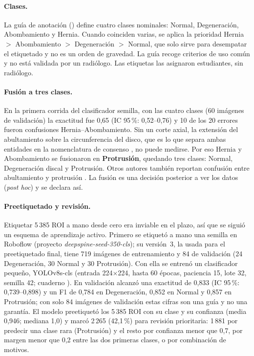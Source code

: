 \paragraph{Clases.} La guía de anotación () define cuatro clases nominales: Normal, Degeneración, Abombamiento y Hernia. Cuando coinciden varias, se aplica la prioridad Hernia $>$ Abombamiento $>$ Degeneración $>$ Normal, que solo sirve para desempatar el etiquetado y no es un orden de gravedad. La guía recoge criterios de uso común y no está validada por un radiólogo. Las etiquetas las asignaron estudiantes, sin radiólogo.

\paragraph{Fusión a tres clases.} En la primera corrida del clasificador semilla, con las cuatro clases (60 imágenes de validación) la exactitud fue 0,65 (IC 95\,\%: 0,52--0,76) y 10 de los 20 errores fueron confusiones Hernia--Abombamiento. Sin un corte axial, la extensión del abultamiento sobre la circunferencia del disco, que es lo que separa ambas entidades en la nomenclatura de consenso \cite{fardon2014}, no puede medirse. Por eso Hernia y Abombamiento se fusionaron en \textbf{Protrusión}, quedando tres clases: Normal, Degeneración discal y Protrusión. Otros autores también reportan confusión entre abultamiento y protrusión \cite{gao2025}. La fusión es una decisión posterior a ver los datos (\emph{post hoc}) y se declara así.

\paragraph{Preetiquetado y revisión.} Etiquetar 5\,385 ROI a mano desde cero era inviable en el plazo, así que se siguió un esquema de aprendizaje activo. Primero se etiquetó a mano una semilla en Roboflow (proyecto \emph{deepspine-seed-350-cls}); su versión~3, la usada para el preetiquetado final, tiene 719 imágenes de entrenamiento y 84 de validación (24 Degeneración, 30 Normal y 30 Protrusión). Con ella se entrenó un clasificador pequeño, YOLOv8s-cls (entrada 224$\times$224, hasta 60 épocas, paciencia 15, lote 32, semilla 42; cuaderno ). En validación alcanzó una exactitud de 0,833 (IC 95\,\%: 0,739--0,898) y un F1 de 0,784 en Degeneración, 0,852 en Normal y 0,857 en Protrusión; con solo 84 imágenes de validación estas cifras son una guía y no una garantía. El modelo preetiquetó los 5\,385 ROI con su clase y su confianza (media 0,946; mediana 1,0) y marcó 2\,265 (42,1\,\%) para revisión prioritaria: 1\,881 por predecir una clase rara (Protrusión) y el resto por confianza menor que 0,7, por margen menor que 0,2 entre las dos primeras clases, o por combinación de motivos.

